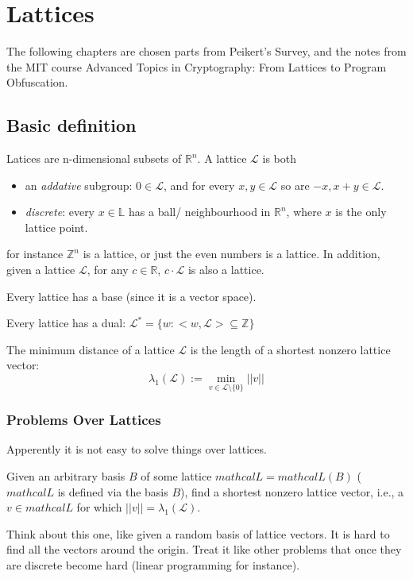\chapter{Lattices}
The following chapters are chosen parts from Peikert's Survey, and the notes from the MIT course Advanced Topics in Cryptography: From Lattices to Program Obfuscation.

\section{Basic definition}

Latices are n-dimensional subsets of $\mathbb{R}^n$. 
A lattice $\mathcal{L}$ is both 
\begin{itemize}
    \item an \emph{addative} subgroup: $0\in \mathcal{L}$, and for every $x,y\in \mathcal{L}$ so are $-x, x+y\in \mathcal{L}$.
    \item \emph{discrete}: every $x\in \mathbb{L}$ has a ball/ neighbourhood in $\mathbb{R}^n$, where $x$ is the only lattice point. 
\end{itemize}

for instance $\mathbb{Z}^n$ is a lattice, or just the even numbers is a lattice. In addition, given a lattice $\mathcal{L}$, for any $c\in \mathbb{R}$, $c\cdot\mathcal{L}$ is also a lattice.

Every lattice has a base (since it is a vector space).

Every lattice has a dual: $\mathcal{L}^*=\{w : <w,\mathcal{L}>\subseteq \mathbb{Z}\}$


\begin{definition}
    The minimum distance of a lattice $\mathcal{L}$ is the length of a shortest nonzero lattice vector:
    $$ 
    \lambda_1(\mathcal{L}) := \min_{v\in \mathcal{L} \setminus \{0\}}{||v||} 
    $$
\end{definition}
\subsection{Problems Over Lattices}
Apperently it is not easy to solve things over lattices. 

\begin{definition}
    Given an arbitrary basis $B$ of some lattice $mathcal{L}= mathcal{L}(B)$ ($mathcal{L}$ is defined via the basis $B$),
find a shortest nonzero lattice vector, i.e., a $v \in mathcal{L}$ for which $||v|| = \lambda_1(\mathcal{L})$.
\end{definition}
Think about this one, like given a random basis of lattice vectors. It is hard to find all the vectors around the origin. 
Treat it like other problems that once they are discrete become hard (linear programming for instance).


